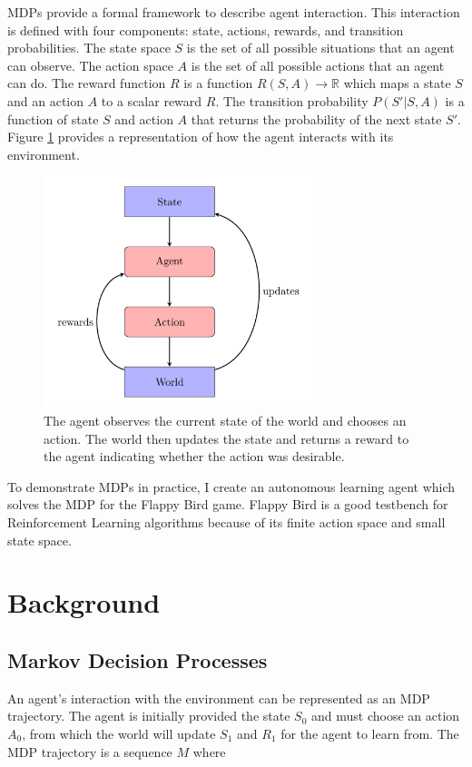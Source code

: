\documentclass{article}
\begin{document}
MDPs provide a formal framework to describe agent interaction.
This interaction is defined with four components: state, actions, rewards, and transition probabilities. 
The state space $S$ is the set of all possible situations that an agent can observe. 
The action space $A$ is the set of all possible actions that an agent can do. 
The reward function $R$ is a function $R(S,A) \rightarrow \mathbb{R}$ which maps a state $S$ and an action $A$ to a scalar reward $R$. 
The transition probability $P(S'|S,A)$ is a function of state $S$ and action $A$ that returns the probability of the next state $S'$.
Figure \ref{fig:chart} provides a representation of how the agent interacts with its environment.

\begin{figure}[H]
\centering
\includegraphics[width=0.7\textwidth]{images/chart.png}
\caption{The agent observes the current state of the world and chooses an action. 
         The world then updates the state and returns a reward to the agent 
         indicating whether the action was desirable.}
\label{fig:chart}
\end{figure}

To demonstrate MDPs in practice, I create an autonomous learning agent which solves the MDP for the Flappy Bird game. Flappy Bird is a good testbench for Reinforcement Learning algorithms because of its finite action space and small state space.

\section{Background}


\subsection{Markov Decision Processes}
An agent's interaction with the environment can be represented as an MDP trajectory. The agent is initially provided the state $S_0$ and must choose an action $A_0$, from which the world will update $S_1$ and $R_1$ for the agent to learn from. The MDP trajectory is a sequence $M$ where
\end{document}

